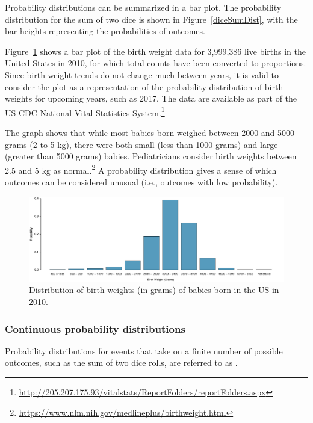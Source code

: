 Probability distributions can be summarized in a bar plot. The probability distribution for the sum of two dice is shown in Figure~\ref{diceSumDist}, with the bar heights representing the probabilities of outcomes.

Figure~\ref{fig:birthwtMarginalDist} shows a bar plot of the birth weight data for 3,999,386 live births in the United States in 2010, for which total counts have been converted to proportions. Since birth weight trends do not change much between years,  it is valid to consider the plot as a representation of the probability distribution of birth weights for upcoming years, such as 2017. The data are available as part of the US CDC National Vital Statistics System.\footnote{\url{http://205.207.175.93/vitalstats/ReportFolders/reportFolders.aspx}} 

The graph shows that while most babies born weighed between 2000 and 5000 grams (2 to 5 kg), there were both small (less than 1000 grams) and large (greater than 5000 grams) babies. Pediatricians consider birth weights between 2.5 and 5 kg as normal.\footnote{\url{https://www.nlm.nih.gov/medlineplus/birthweight.html}} A probability distribution gives a sense of which outcomes can be considered unusual (i.e., outcomes with low probability).


\begin{figure}[h]
	\includegraphics[width=\textwidth]{ch_probability_oi_biostat/figures/birthwtMarginalDist/birthwtMarginalDist.pdf}
	\caption{Distribution of birth weights (in grams) of babies born in the US in 2010.}
	\label{fig:birthwtMarginalDist}
\end{figure}

\subsubsection{Continuous probability distributions}
\label{contDist}


Probability distributions for events that take on a finite number of possible outcomes, such as the sum of two dice rolls, are referred to as . 

